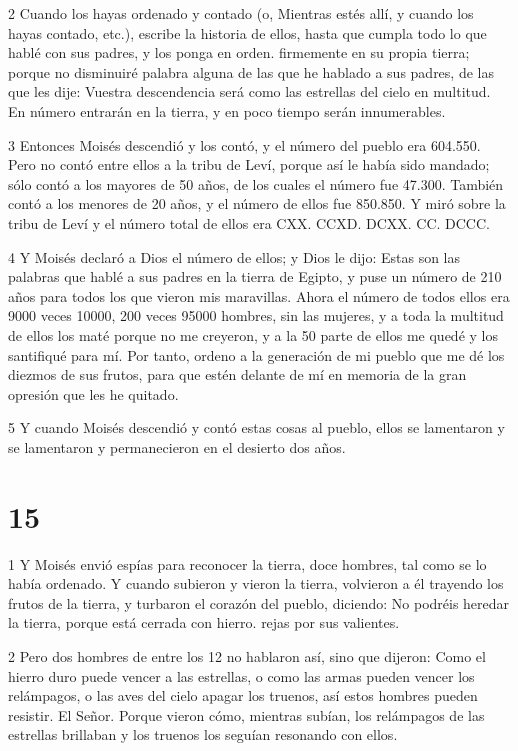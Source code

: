 \par 2 Cuando los hayas ordenado y contado (o, Mientras estés allí, y cuando los hayas contado, etc.), escribe la historia de ellos, hasta que cumpla todo lo que hablé con sus padres, y los ponga en orden. firmemente en su propia tierra; porque no disminuiré palabra alguna de las que he hablado a sus padres, de las que les dije: Vuestra descendencia será como las estrellas del cielo en multitud. En número entrarán en la tierra, y en poco tiempo serán innumerables.

\par 3 Entonces Moisés descendió y los contó, y el número del pueblo era 604.550. Pero no contó entre ellos a la tribu de Leví, porque así le había sido mandado; sólo contó a los mayores de 50 años, de los cuales el número fue 47.300. También contó a los menores de 20 años, y el número de ellos fue 850.850. Y miró sobre la tribu de Leví y el número total de ellos era CXX. CCXD. DCXX. CC. DCCC.

\par 4 Y Moisés declaró a Dios el número de ellos; y Dios le dijo: Estas son las palabras que hablé a sus padres en la tierra de Egipto, y puse un número de 210 años para todos los que vieron mis maravillas. Ahora el número de todos ellos era 9000 veces 10000, 200 veces 95000 hombres, sin las mujeres, y a toda la multitud de ellos los maté porque no me creyeron, y a la 50 parte de ellos me quedé y los santifiqué para mí. Por tanto, ordeno a la generación de mi pueblo que me dé los diezmos de sus frutos, para que estén delante de mí en memoria de la gran opresión que les he quitado.

\par 5 Y cuando Moisés descendió y contó estas cosas al pueblo, ellos se lamentaron y se lamentaron y permanecieron en el desierto dos años.

\chapter{15}

\par 1 Y Moisés envió espías para reconocer la tierra, doce hombres, tal como se lo había ordenado. Y cuando subieron y vieron la tierra, volvieron a él trayendo los frutos de la tierra, y turbaron el corazón del pueblo, diciendo: No podréis heredar la tierra, porque está cerrada con hierro. rejas por sus valientes.

\par 2 Pero dos hombres de entre los 12 no hablaron así, sino que dijeron: Como el hierro duro puede vencer a las estrellas, o como las armas pueden vencer los relámpagos, o las aves del cielo apagar los truenos, así estos hombres pueden resistir. El Señor. Porque vieron cómo, mientras subían, los relámpagos de las estrellas brillaban y los truenos los seguían resonando con ellos.

